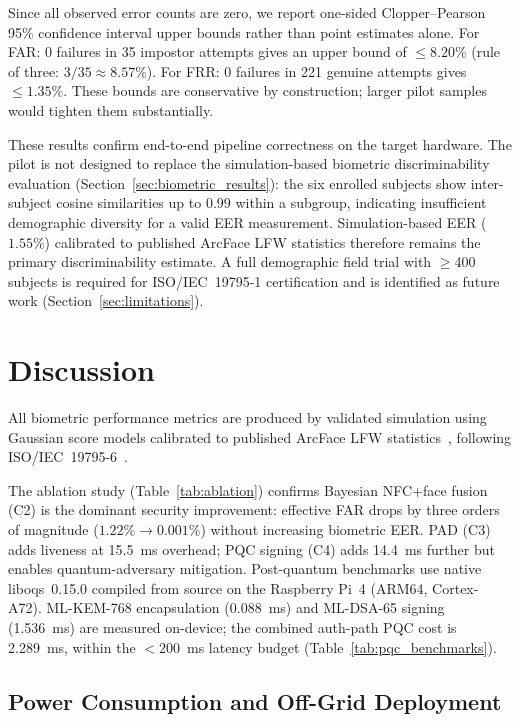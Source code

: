 \documentclass[conference]{IEEEtran}
\begin{document}
Since all observed error counts are zero, we report one-sided
Clopper--Pearson 95\% confidence interval upper bounds rather than
point estimates alone. For FAR: 0 failures in 35 impostor attempts
gives an upper bound of \(\leq8.20\%\) (rule of three: \(3/35
\approx 8.57\%\)). For FRR: 0 failures in 221 genuine attempts gives
\(\leq1.35\%\). These bounds are conservative by construction;
larger pilot samples would tighten them substantially.

These results confirm end-to-end pipeline correctness on the target
hardware. The pilot is not designed to replace the simulation-based
biometric discriminability evaluation (Section~\ref{sec:biometric_results}):
the six enrolled subjects show inter-subject cosine similarities up to
\(0.99\) within a subgroup, indicating insufficient demographic diversity
for a valid EER measurement. Simulation-based EER (\(1.55\%\)) calibrated
to published ArcFace LFW statistics therefore remains the primary
discriminability estimate. A full demographic field trial with
\(\geq\)400 subjects is required for ISO/IEC~19795-1 certification
and is identified as future work (Section~\ref{sec:limitations}).

\section{Discussion}
\label{sec:discussion}

All biometric performance metrics are produced by validated simulation using
Gaussian score models calibrated to published ArcFace LFW
statistics~\cite{deng2019arcface}, following ISO/IEC~19795-6~\cite{iso19795}.

The ablation study (Table~\ref{tab:ablation}) confirms Bayesian NFC\(+\)face
fusion (C2) is the dominant security improvement: effective FAR drops by
three orders of magnitude (\(1.22\% \to 0.001\%\)) without increasing
biometric EER. PAD (C3) adds liveness at 15.5~ms overhead; PQC signing (C4)
adds 14.4~ms further but enables quantum-adversary mitigation.
Post-quantum benchmarks use native liboqs~0.15.0 compiled from source on
the Raspberry Pi~4 (ARM64, Cortex-A72). ML-KEM-768 encapsulation
(0.088~ms) and ML-DSA-65 signing (1.536~ms) are measured on-device;
the combined auth-path PQC cost is 2.289~ms, within the \(<200\)~ms
latency budget (Table~\ref{tab:pqc_benchmarks}).

\subsection{Power Consumption and Off-Grid Deployment}
\label{sec:power}
\end{document}
